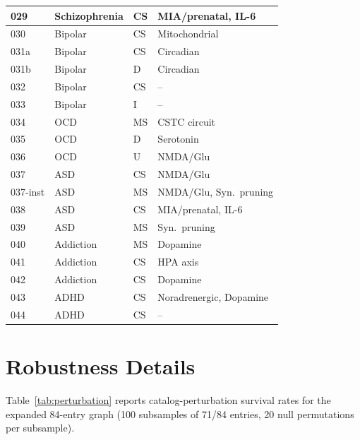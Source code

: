 \documentclass{article}
\begin{document}
\begin{table}[h]
\begin{tabular}{llll}
029 & Schizophrenia & CS & MIA/prenatal, IL-6 \\
\midrule
030 & Bipolar & CS & Mitochondrial \\
031a & Bipolar & CS & Circadian \\
031b & Bipolar & D & Circadian \\
032 & Bipolar & CS & -- \\
033 & Bipolar & I & -- \\
\midrule
034 & OCD & MS & CSTC circuit \\
035 & OCD & D & Serotonin \\
036 & OCD & U & NMDA/Glu \\
\midrule
037 & ASD & CS & NMDA/Glu \\
037-inst & ASD & MS & NMDA/Glu, Syn.\ pruning \\
038 & ASD & CS & MIA/prenatal, IL-6 \\
039 & ASD & MS & Syn.\ pruning \\
\midrule
040 & Addiction & MS & Dopamine \\
041 & Addiction & CS & HPA axis \\
042 & Addiction & CS & Dopamine \\
\midrule
043 & ADHD & CS & Noradrenergic, Dopamine \\
044 & ADHD & CS & -- \\
\bottomrule
\end{tabular}
\end{table}

\section{Robustness Details}
\label{app:robustness}

Table~\ref{tab:perturbation} reports catalog-perturbation survival rates for the expanded 84-entry graph (100 subsamples of 71/84 entries, 20 null permutations per subsample).
\end{document}
